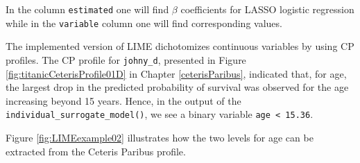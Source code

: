 \documentclass[]{krantz}
\newenvironment{Shaded}{\begin{snugshade}}{\end{snugshade}}
\newcommand{\CommentTok}[1]{\textcolor[rgb]{0.56,0.35,0.01}{\textit{#1}}}
\newcommand{\DataTypeTok}[1]{\textcolor[rgb]{0.13,0.29,0.53}{#1}}
\newcommand{\DecValTok}[1]{\textcolor[rgb]{0.00,0.00,0.81}{#1}}
\newcommand{\KeywordTok}[1]{\textcolor[rgb]{0.13,0.29,0.53}{\textbf{#1}}}
\newcommand{\NormalTok}[1]{#1}
\newcommand{\OperatorTok}[1]{\textcolor[rgb]{0.81,0.36,0.00}{\textbf{#1}}}
\newcommand{\StringTok}[1]{\textcolor[rgb]{0.31,0.60,0.02}{#1}}
\begin{document}
\begin{Shaded}
\end{Shaded}

In the column \texttt{estimated} one will find \(\beta\) coefficients for LASSO logistic regression while in the \texttt{variable} column one will find corresponding values.

The implemented version of LIME dichotomizes continuous variables by using CP profiles. The CP profile for \texttt{johny\_d}, presented in Figure \ref{fig:titanicCeterisProfile01D} in Chapter \ref{ceterisParibus}, indicated that, for age, the largest drop in the predicted probability of survival was observed for the age increasing beyond 15 years. Hence, in the output of the \texttt{individual\_surrogate\_model()}, we see a binary variable \texttt{age\ \textless{}\ 15.36}.

Figure \ref{fig:LIMEexample02} illustrates how the two levels for age can be extracted from the Ceteris Paribus profile.
\end{document}
